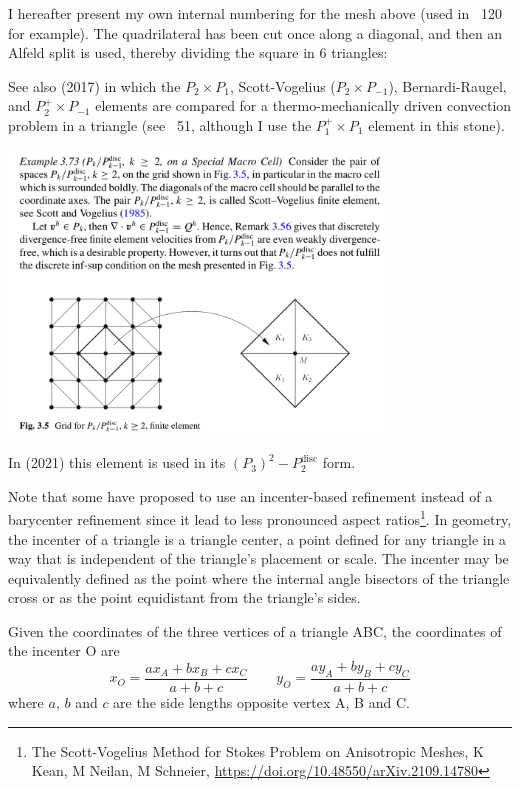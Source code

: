 I hereafter present my own internal numbering for the mesh above (used in \stone~120 for example).
The quadrilateral has been cut once along a diagonal, and then an Alfeld split is used, thereby 
dividing the square in 6 triangles:



See also \textcite{jolm17} (2017) in which the $P_2\times P_1$, Scott-Vogelius ($P_2\times P_{-1}$), 
Bernardi-Raugel, and $P_2^+\times P_{-1}$ elements 
are compared for a thermo-mechanically driven convection problem in a triangle (see \stone~51, 
although I use the $P_1^+\times P_1$ element in this stone).


\begin{center}
\includegraphics[width=10cm]{images/pair_scott_vogelius/john_scott_vogelius}\\
\end{center}


In \textcite{befh21} (2021) this element is used in its 
$(P_3)^2-P_2^{\text{disc}}$ form.

Note that some have proposed to use an incenter-based refinement instead of
a barycenter refinement since it lead to less pronounced aspect ratios\footnote{
The Scott-Vogelius Method for Stokes Problem on Anisotropic Meshes, K Kean, M Neilan, M Schneier,
\url{https://doi.org/10.48550/arXiv.2109.14780}}.
In geometry, the incenter of a triangle is a triangle center, a point defined for 
any triangle in a way that is independent of the triangle's placement or scale. 
The incenter may be equivalently defined as the point where the internal angle bisectors 
of the triangle cross or as the point equidistant from the triangle's sides.

Given the coordinates of the three vertices of a triangle ABC,
the coordinates of the incenter O are
\[
x_O=\frac{ax_A+bx_B+cx_C}{a+b+c}
\qquad
y_O=\frac{ay_A+by_B+cy_C}{a+b+c}
\] 
where $a$, $b$ and $c$ are the side lengths opposite vertex A, B and C.

